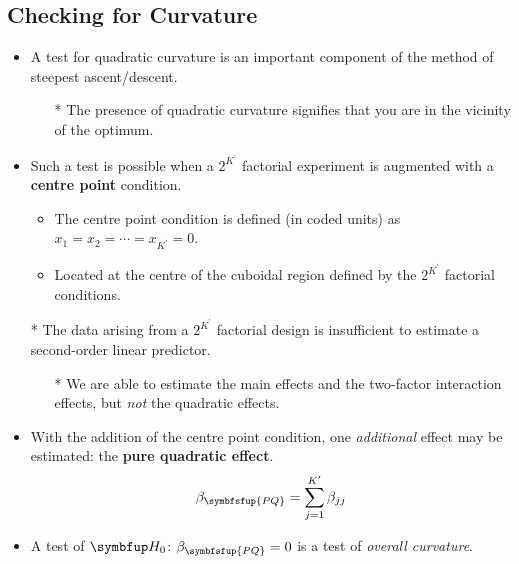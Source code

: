 \subsection{Checking for Curvature}
\begin{itemize}
      \item A test for quadratic curvature is an important component of the method of steepest ascent/descent.
            \begin{itemize}
                  \item[*] The presence of quadratic curvature signifies that you are in the vicinity of the optimum.
            \end{itemize}
      \item Such a test is possible when a $ 2^{K^\prime} $ factorial experiment is augmented with a \textbf{centre point} condition.
            \begin{itemize}
                  \item The centre point condition is defined (in coded units) as $ x_1=x_2=\cdots=x_{K^\prime}=0 $.
                  \item Located at the centre of the cuboidal region defined by the $ 2^{K^\prime} $ factorial conditions.
            \end{itemize}
      \item[*] The data arising from a $ 2^{K^\prime} $ factorial design is insufficient to estimate a second-order linear predictor.
            \begin{itemize}
                  \item[*] We are able to estimate the main effects and the two-factor interaction effects, but \emph{not} the quadratic effects.
            \end{itemize}
      \item With the addition of the centre point condition, one \emph{additional} effect may be estimated: the \textbf{pure quadratic effect}.
            \[ \beta_{\symbfsfup{PQ}}=\sum_{j=1}^{K^\prime} \beta_{jj} \]
      \item A test of $ \HN $: $ \beta_{\symbfsfup{PQ}}=0 $ is a test of \emph{overall curvature}.
\end{itemize}
